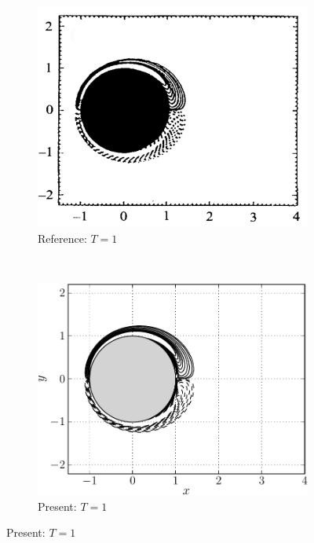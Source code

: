 	\begin{figure}[p]
     \centering
     \begin{subfigure}[t]{0.45\textwidth}
             \includegraphics[height=0.2\textheight]{figures/eulerian/ISC_vorticityContours_t1_ref-mod.png}
             \caption{Reference: $T=1$}
             \label{fig:ISC_vorticityContours_t1_ref}
     \end{subfigure}%
     ~ %
     \begin{subfigure}[t]{0.45\textwidth}
             \includegraphics[height=0.2\textheight]{figures/eulerian/ISC_vorticityContours_t1_fliped-crop.pdf}
             \caption{Present: $T=1$}
             \label{fig:ISC_vorticityContours_t1-crop}
     \end{subfigure}
     

\end{figure}
